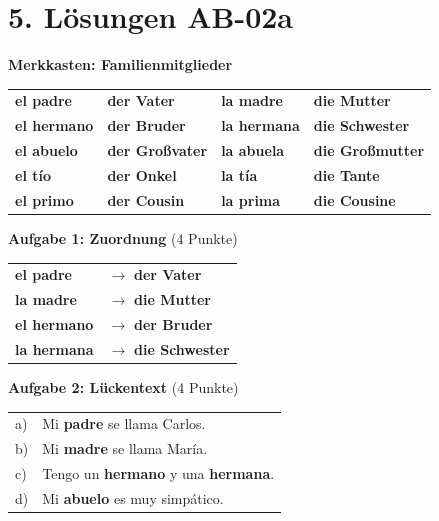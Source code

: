 \documentclass[11pt, a4paper]{article}
\newcommand{\fachfarbe}{spanisch}
\newcommand{\loesung}[1]{\textcolor{loesung}{\textbf{#1}}}
\newcommand{\es}[1]{\textcolor{\fachfarbe}{\textbf{#1}}}
\begin{document}

\section*{5. Lösungen AB-02a}

\textbf{Merkkasten: Familienmitglieder}

\begin{tabular}{ll|ll}
\es{el padre} & \loesung{der Vater} & \es{la madre} & \loesung{die Mutter} \\
\es{el hermano} & \loesung{der Bruder} & \es{la hermana} & \loesung{die Schwester} \\
\es{el abuelo} & \loesung{der Großvater} & \es{la abuela} & \loesung{die Großmutter} \\
\es{el tío} & \loesung{der Onkel} & \es{la tía} & \loesung{die Tante} \\
\es{el primo} & \loesung{der Cousin} & \es{la prima} & \loesung{die Cousine} \\
\end{tabular}

\vspace{1em}

\textbf{Aufgabe 1: Zuordnung} (4 Punkte)

\begin{tabular}{ll}
\es{el padre} & $\rightarrow$ \loesung{der Vater} \\
\es{la madre} & $\rightarrow$ \loesung{die Mutter} \\
\es{el hermano} & $\rightarrow$ \loesung{der Bruder} \\
\es{la hermana} & $\rightarrow$ \loesung{die Schwester} \\
\end{tabular}

\vspace{1em}

\textbf{Aufgabe 2: Lückentext} (4 Punkte)

\begin{tabular}{ll}
a) & Mi \loesung{padre} se llama Carlos. \\
b) & Mi \loesung{madre} se llama María. \\
c) & Tengo un \loesung{hermano} y una \loesung{hermana}. \\
d) & Mi \loesung{abuelo} es muy simpático. \\
\end{tabular}
\end{document}
